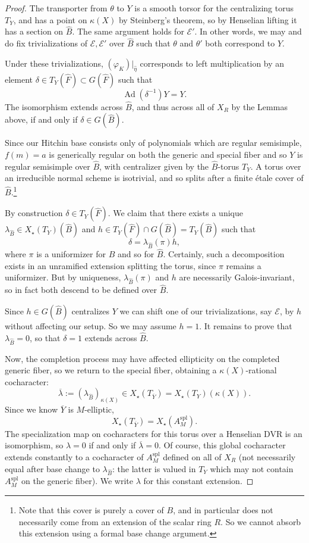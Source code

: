 \documentclass[openany]{amsbook}
\theoremstyle{definition}
\theoremstyle{remark}
\numberwithin{equation}{section}
\newcommand{\cE}{\mathcal{E}}
\newcommand{\ol}[1]{\overline{#1}}
\renewcommand{\phi}{\varphi}
\renewcommand{\-}{\operatorname{-}}
\newcommand{\on}[1]{\operatorname{#1}}
\newcommand{\spl}{\mathrm{spl}}
\begin{document}
\begin{proof}
The transporter from $\theta$ to $Y$ is a smooth torsor for the centralizing torus $T_Y$, and has a point on $\kappa(X)$ by Steinberg's theorem, so by Henselian lifting it has a section on $\widehat{B}$. The same argument holds for $\cE'$. In other words, we may and do fix trivializations of $\cE, \cE'$ over $\widehat{B}$ such that $\theta$ and $\theta'$ both correspond to $Y$. 



Under these trivializations, $(\phi_K)|_{\widehat{\eta}}$ corresponds to left multiplication by an element $\delta \in T_Y(\widehat{F}) \subset G(\widehat{F})$ such that 
\[
    \on{Ad}(\delta^{-1})Y = Y.
\]
The isomorphism extends across $\widehat{B}$, and thus across all of $X_R$ by the Lemmas above, if and only if $\delta \in G(\widehat{B})$. 

Since our Hitchin base consists only of polynomials which are regular semisimple, $f(m) = a$ is generically regular on both the generic and special fiber and so $Y$ is regular semisimple over $\widehat{B}$, with centralizer given by the $\widehat{B}$-torus $T_Y$. A torus over an irreducible normal scheme is isotrivial, and so splits after a finite \'etale cover of $\widehat{B}$.\footnote{Note that this cover is purely a cover of $B$, and in particular does not necessarily come from an extension of the scalar ring $R$. So we cannot absorb this extension using a formal base change argument.}

By construction $\delta \in T_Y(\widehat{F})$. We claim that there exists a unique $\lambda_{\widehat{B}} \in X_\star(T_Y)(\widehat{B})$ and $h \in T_Y(\widehat{F}) \cap G(\widehat{B}) = T_Y(\widehat{B})$ such that
\[
    \delta = \lambda_{\widehat{B}}(\pi) h,
\]
where $\pi$ is a uniformizer for $B$ and so for $\widehat{B}$. Certainly, such a decomposition exists in an unramified extension splitting the torus, since $\pi$ remains a uniformizer. But by uniqueness, $\lambda_{\widehat{B}}(\pi)$ and $h$ are necessarily Galois-invariant, so in fact both descend to be defined over $\widehat{B}$.

Since $h \in G(\widehat{B})$ centralizes $Y$ we can shift one of our trivializations, say $\cE$, by $h$ without affecting our setup. So we may assume $h = 1$. It remains to prove that $\lambda_{\widehat{B}} = 0$, so that $\delta = 1$ extends across $\widehat{B}$.

Now, the completion process may have affected ellipticity on the completed generic fiber, so we return to the special fiber, obtaining a $\kappa(X)$-rational cocharacter:
$$
    \ol{\lambda} := (\lambda_{\widehat{B}})_{\kappa(X)} \in X_\star(T_{\ol{Y}}) = X_\star(T_Y)(\kappa(X)).
$$
Since we know $\ol{Y}$ is $M$-elliptic,
$$
    X_\star(T_{\ol{Y}}) = X_\star(A_M^{\spl}).
$$
The specialization map on cocharacters for this torus over a Henselian DVR is an isomorphism, so $\lambda = 0$ if and only if $\ol{\lambda} = 0$. Of course, this global cocharacter extends constantly to a cocharacter of $A_M^{\spl}$ defined on all of $X_R$ (not necessarily equal after base change to $\lambda_{\widehat{B}}$: the latter is valued in $T_Y$ which may not contain $A_M^{\spl}$ on the generic fiber). We write $\lambda$ for this constant extension. 




\end{proof}
\end{document}
